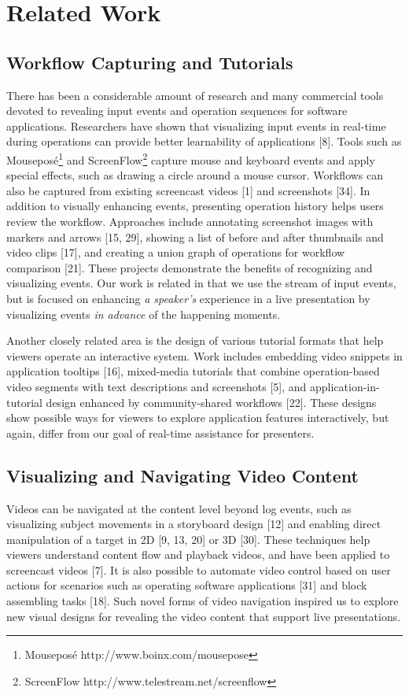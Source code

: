\section{Related Work}

\subsection{Workflow Capturing and Tutorials}
There has been a considerable amount of research and many commercial tools devoted to revealing input events and operation sequences for software applications. Researchers have shown that visualizing input events in real-time during operations can provide better learnability of applications [8]. Tools such as Mouseposé\footnote{Mouseposé http://www.boinx.com/mousepose} and ScreenFlow\footnote{ScreenFlow http://www.telestream.net/screenflow} capture mouse and keyboard events and apply special effects, such as drawing a circle around a mouse cursor. Workflows can also be captured from existing screencast videos [1] and screenshots [34]. In addition to visually enhancing events, presenting operation history helps users review the workflow. Approaches include annotating screenshot images with markers and arrows [15, 29], showing a list of before and after thumbnails and video clips [17], and creating a union graph of operations for workflow comparison [21]. These projects demonstrate the benefits of recognizing and visualizing events. Our work is related in that we use the stream of input events, but is focused on enhancing \textit{a speaker's} experience in a live presentation by visualizing events \textit{in advance} of the happening moments.

Another closely related area is the design of various tutorial formats that help viewers operate an interactive system. Work includes embedding video snippets in application tooltips [16], mixed-media tutorials that combine operation-based video segments with text descriptions and screenshots [5], and application-in-tutorial design enhanced by community-shared workflows [22]. These designs show possible ways for viewers to explore application features interactively, but again, differ from our goal of real-time assistance for presenters.

\subsection{Visualizing and Navigating Video Content}
Videos can be navigated at the content level beyond log events, such as visualizing subject movements in a storyboard design [12] and enabling direct manipulation of a target in 2D [9, 13, 20] or 3D [30]. These techniques help viewers understand content flow and playback videos, and have been applied to screencast videos [7]. It is also possible to automate video control based on user actions for scenarios such as operating software applications [31] and block assembling tasks [18]. Such novel forms of video navigation inspired us to explore new visual designs for revealing the video content that support live presentations.

